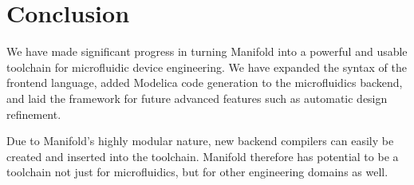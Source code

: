 \section{Conclusion}

We have made significant progress in turning Manifold into a powerful and usable toolchain for microfluidic device engineering.
We have expanded the syntax of the frontend language, added Modelica code generation to the microfluidics backend, and laid the framework for future advanced features such as automatic design refinement.

Due to Manifold's highly modular nature, new backend compilers can easily be created and inserted into the toolchain.
Manifold therefore has potential to be a toolchain not just for microfluidics, but for other engineering domains as well.
